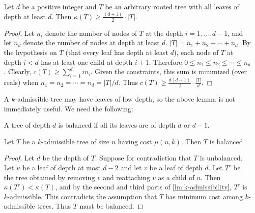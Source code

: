 \documentclass[unicode,review]{siamart1116}
\numberwithin{theorem}{section}
\begin{document}
\begin{lemma}
\label{lm:k-d-cost}
Let $d$ be a positive integer and $T$ be an arbitrary rooted tree with all leaves of depth at least $d$. Then 
$\kappa(T) \geq \frac{(d + 1)}{2} \cdot |T|$.
\end{lemma}
\begin{proof} %
Let $n_i$ denote the number of nodes of $T$ at the depth $i = 1, \dotsc, d - 1$, and let $n_d$ denote the number of  nodes at depth at least $d$. $|T|=n_1+n_2 + \dotsb + n_d$.  By the hypothesis on $T$ (that every leaf has depth at least $d$),
each node of $T$ at depth $i<d$ has at least one child at depth $i+1$.  Therefore $0\leq n_1 \leq n_2 \leq \dotsb \leq n_d$.
Clearly, $c(T) \geq \sum_{i=1}^d in_i$.
Given the constraints, this sum is minimized (over reals) when $n_1=n_2=\dotsb =n_d = |T| / d $. Thus $c(T) \geq \frac{d(d + 1)}{2} \cdot \frac{|T|}{d}$.
\end{proof}

A $k$-admissible tree may have leaves of low depth, so the above lemma is not immediately useful. We need
the following:

\begin{definition}
A tree of depth $d$ is balanced if all its leaves are of depth $d$ or $d - 1$.
\end{definition}


\begin{lemma}
\label{lm:balanced}
Let $T$ be a $k$-admissible tree of size $n$ having cost $\mu(n,k)$. Then $T$ is balanced.
\end{lemma}

\begin{proof}  %
Let $d$ be the depth of $T$.  Suppose for contradiction that $T$ is unbalanced.
Let $u$ be a leaf  of depth at most $d-2$ and let $v$ be a leaf of depth $d$.
Let $T'$ be the tree obtained by  
removing $v$ and reattaching $v$ as a child of  $u$. Then $\kappa(T') <\kappa(T)$, and  
by the second and third parts of \cref{lm:k-admissibility}, $T'$ is $k$-admissible. This  contradicts the assumption
that $T$ has minimum cost among $k$-admissible trees. 
Thus $T$ must be balanced.
\end{proof}
\end{document}
